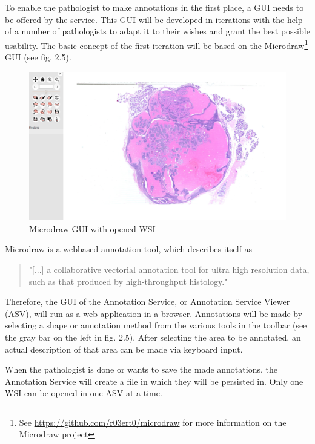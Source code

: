 To enable the pathologist to make annotations in the first place, a GUI needs to be offered by the service. This GUI will be developed in iterations with the help of a number of pathologists to adapt it to their wishes and grant the best possible usability. The basic concept of the first iteration will be based on the Microdraw\footnote{See \url{https://github.com/r03ert0/microdraw} for more information on the Microdraw project} GUI (see fig. 2.5).

\begin{figure}[H]
	\begin{center}
		\includegraphics[scale=0.2]{img/microdrawUI.png}
		\caption{Microdraw GUI with opened WSI}
		\label{fig:fig2.5}
	\end{center}
\end{figure}

Microdraw is a webbased annotation tool, which describes itself as

\begin{quotation}
	"[...] a collaborative vectorial annotation tool for ultra high resolution data, such as that produced by high-throughput histology." \cite{web:microdraw}
\end{quotation}

Therefore, the GUI of the Annotation Service, or Annotation Service Viewer (ASV), will run as a web application in a browser. Annotations will be made by selecting a shape or annotation method from the various tools in the toolbar (see the gray bar on the left in fig. 2.5). After selecting the area to be annotated, an actual description of that area can be made via keyboard input.

When the pathologist is done or wants to save the made annotations, the Annotation Service will create a file in which they will be persisted in. Only one WSI can be opened in one ASV at a time.


